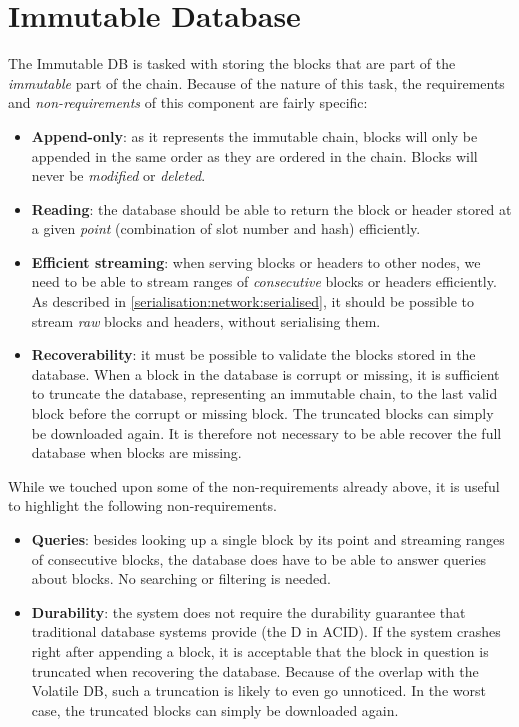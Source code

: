 \newcommand{\chunkNumber}[1]{\ensuremath{\mathsf{chunkNumber}(#1)}}
\newcommand{\relativeSlot}[2]{\ensuremath{\mathsf{relativeSlot}(#1, #2)}}

\chapter{Immutable Database}
\label{immutable}

The Immutable DB is tasked with storing the blocks that are part of the
\emph{immutable} part of the chain. Because of the nature of this task, the
requirements and \emph{non-requirements} of this component are fairly specific:

\begin{itemize}
\item \textbf{Append-only}: as it represents the immutable chain, blocks will
  only be appended in the same order as they are ordered in the chain. Blocks
  will never be \emph{modified} or \emph{deleted}.
\item \textbf{Reading}: the database should be able to return the block or
  header stored at a given \emph{point} (combination of slot number and hash)
  efficiently.
\item \textbf{Efficient streaming}: when serving blocks or headers to other
  nodes, we need to be able to stream ranges of \emph{consecutive} blocks or
  headers efficiently. As described in \cref{serialisation:network:serialised},
  it should be possible to stream \emph{raw} blocks and headers, without
  serialising them.
\item \textbf{Recoverability}: it must be possible to validate the blocks stored
  in the database. When a block in the database is corrupt or missing, it is
  sufficient to truncate the database, representing an immutable chain, to the
  last valid block before the corrupt or missing block. The truncated blocks can
  simply be downloaded again. It is therefore not necessary to be able recover
  the full database when blocks are missing.
\end{itemize}

While we touched upon some of the non-requirements already above, it is useful
to highlight the following non-requirements.

\begin{itemize}
\item \textbf{Queries}: besides looking up a single block by its point and
  streaming ranges of consecutive blocks, the database does have to be able to
  answer queries about blocks. No searching or filtering is needed.
\item \textbf{Durability}: the system does not require the durability guarantee
  that traditional database systems provide (the D in ACID). If the system
  crashes right after appending a block, it is acceptable that the block in
  question is truncated when recovering the database. Because of the overlap
  with the Volatile DB, such a truncation is likely to even go
  unnoticed. In the worst case, the truncated blocks can simply be downloaded
  again.
\end{itemize}

